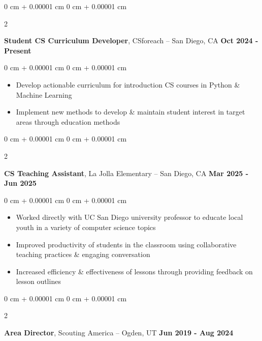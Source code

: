 \documentclass[10pt, letterpaper]{article}
\newenvironment{highlights}{
    \begin{itemize}[
        topsep=0.10 cm,
        parsep=0.10 cm,
        partopsep=0pt,
        itemsep=0pt,
        leftmargin=0 cm + 10pt
    ]
}{
    \end{itemize}
} %
\newenvironment{onecolentry}{
    \begin{adjustwidth}{
        0 cm + 0.00001 cm
    }{
        0 cm + 0.00001 cm
    }
}{
    \end{adjustwidth}
} %
\newenvironment{twocolentry}[2][]{
    \onecolentry%
    \def\secondColumn{#2}
    \setcolumnwidth{\fill, 7.0 cm}
    \begin{paracol}{2}
}{
    \switchcolumn\raggedleft\secondColumn%
    \end{paracol}
    \endonecolentry%
} %
\begin{document}
        \vspace{0.2 cm}

        \begin{twocolentry}{
            {\color{secondaryColor}\textbf{Oct 2024 - Present}}
        }
            \textbf{Student CS Curriculum Developer}, CSforeach -- San Diego, CA\end{twocolentry}

        \vspace{0.10 cm}
        \begin{onecolentry}
            \begin{highlights}
                \item Develop actionable curriculum for introduction CS courses in Python \& Machine Learning
                \item Implement new methods to develop \& maintain student interest in target areas through education methods
            \end{highlights}
        \end{onecolentry}


        \vspace{0.2 cm}

        \begin{twocolentry}{
            {\color{secondaryColor}\textbf{Mar 2025 - Jun 2025}}
        }
            \textbf{CS Teaching Assistant}, La Jolla Elementary -- San Diego, CA\end{twocolentry}

        \vspace{0.10 cm}
        \begin{onecolentry}
            \begin{highlights}
                \item Worked directly with UC San Diego university professor to educate local youth in a variety of computer science topics 
                \item Improved productivity of students in the classroom using collaborative teaching practices \& engaging conversation
                \item Increased efficiency \& effectiveness of lessons through providing feedback on lesson outlines
            \end{highlights}
        \end{onecolentry}
        
        \vspace{0.2 cm}


        \begin{twocolentry}{
            {\color{secondaryColor}\textbf{Jun 2019 - Aug 2024}}
        }
            \textbf{Area Director}, Scouting America -- Ogden, UT\end{twocolentry}
\end{document}
